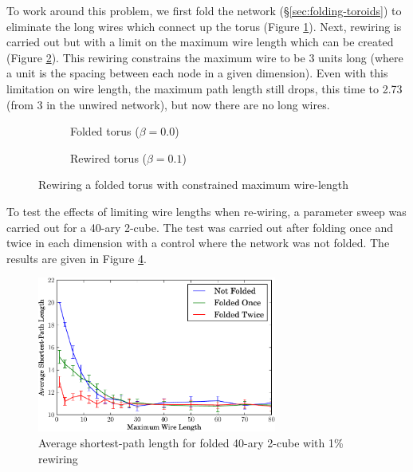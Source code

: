 			To work around this problem, we first fold the network
			(\S\ref{sec:folding-toroids}) to eliminate the long wires which connect up
			the torus (Figure \ref{fig:torusNetworkFB0}). Next, rewiring is carried
			out but with a limit on the maximum wire length which can be created
			(Figure \ref{fig:torusNetworkFB01}).  This rewiring constrains the maximum
			wire to be 3 units long (where a unit is the spacing between each node in
			a given dimension). Even with this limitation on wire length, the maximum
			path length still drops, this time to 2.73 (from 3 in the unwired
			network), but now there are no long wires.
			
			\begin{figure}
				\center
				\begin{subfigure}[t]{0.45\textwidth}
					\center
					
					\caption{Folded torus ($\beta=0.0$)}
					\label{fig:torusNetworkFB0}
				\end{subfigure}
				\begin{subfigure}[t]{0.45\textwidth}
					\center
					
					\caption{Rewired torus ($\beta=0.1$)}
					\label{fig:torusNetworkFB01}
				\end{subfigure}
				
				\caption{Rewiring a folded torus with constrained maximum wire-length}
				\label{fig:torusNetworkF}
			\end{figure}
			
			To test the effects of limiting wire lengths when re-wiring, a parameter
			sweep was carried out for a 40-ary 2-cube. The test was carried out after
			folding once and twice in each dimension with a control where the network
			was not folded. The results are given in Figure
			\ref{fig:smallWorldLimitedWiring}.
			
			\begin{figure}
				\center
				\includegraphics[width=0.7\textwidth]{figures/smallWorldLimitedWiring}
				\caption{Average shortest-path length for folded 40-ary 2-cube with 1\% rewiring}
				\label{fig:smallWorldLimitedWiring}
			\end{figure}
			
